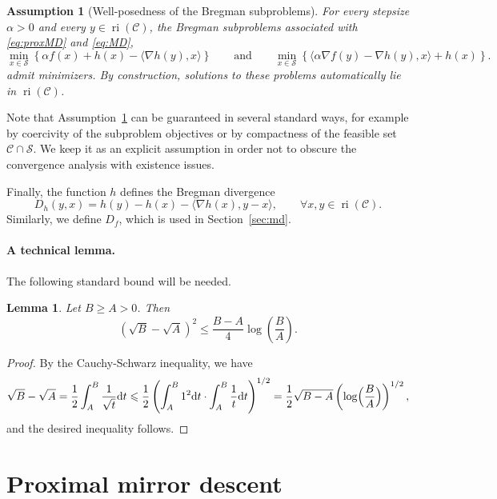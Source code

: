 \documentclass[a4paper]{article}
\renewcommand{\leq}{\leqslant}
\renewcommand{\geq}{\geqslant}
\newcommand{\CC}{\mathcal{C}}
\renewcommand{\SS}{\mathcal{S}}
\newcommand{\ip}[2]{\langle #1, #2\rangle}
\DeclareMathOperator{\ri}{ri}
\newtheorem{lemma}{Lemma}
\newtheorem{assumption}{Assumption}
\begin{document}
\begin{assumption}[Well-posedness of the Bregman subproblems]\label{ass:wellposed}
        For every stepsize $\alpha >0$ and every $y\in \ri(\CC)$, the Bregman subproblems associated with \eqref{eq:proxMD} and \eqref{eq:MD},
        \[
        \min_{x\in \SS}
        \left\{
        \alpha f(x)+h(x)-\ip{\nabla h(y)}{x}
      \right\}\qquad\text{and}\qquad
      \min_{x\in \SS}
        \left\{
        \ip{\alpha\nabla f(y)-\nabla h(y)}{x}+h(x)
        \right\}.
        \]
        admit minimizers.
        By construction, solutions to these problems automatically lie in $\ri(\CC)$.
\end{assumption}

Note that Assumption~\ref{ass:wellposed} can be guaranteed in several standard ways, for example by coercivity of the subproblem objectives or by compactness of the feasible set \(\CC\cap \SS\).
We keep it as an explicit assumption in order not to obscure the convergence analysis with existence issues.

Finally, the function $h$ defines the Bregman divergence
\[
        D_h(y,x) =  h(y)-h(x)-\ip{\nabla h(x)}{y-x},
        \qquad
        \forall x,y\in\ri(\CC).
\]
Similarly, we define $D_f$, which is used in Section~\ref{sec:md}.

\paragraph{A technical lemma.}
The following standard bound will be needed.
\begin{lemma}\label{lem:bound2}
        Let $B\geq A> 0$. Then 
        \[
        \left(\sqrt{B} - \sqrt{A}\right)^2\leq \frac{B-A}{4} \log\left(\frac{B}{A}\right).
        \]
\end{lemma}
\begin{proof}
By the Cauchy-Schwarz inequality, we have
\begin{align*}
        \sqrt{B} - \sqrt {A}
        =
        \frac 1 2 \int_{A}^{B} \frac{1}{\sqrt{t}} \mathrm{d}t
        \leq
        \frac 1 2\left(\int_{A}^{B} 1^2\mathrm{d}t \cdot \int_{A}^{B}\frac{1}{t} \mathrm{d}t\right)^{1/2}
        =
        \frac 1 2 \sqrt{B-A}\left(\log\Bigl(\frac{B}{A}\Bigr)\right)^{1/2},
\end{align*} 
and the desired inequality follows.
\end{proof}


\section{Proximal mirror descent}\label{sec:prox_bregman}
\end{document}
